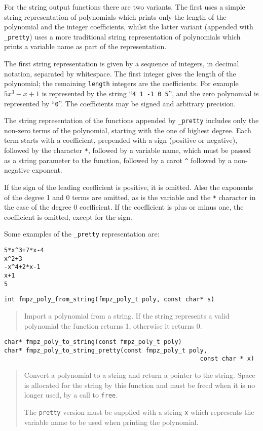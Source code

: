 \documentclass[a4paper,10pt]{article}
\newcommand{\code}{\lstinline}
\begin{document}
For the string output functions there are two variants. The first uses a simple string representation of polynomials which prints only the length of the polynomial and the integer coefficients, whilst the latter variant (appended with \code{_pretty}) uses a more traditional string representation of polynomials which prints a variable name as part of the representation. 

The first string representation is given by a sequence of integers, in decimal notation, separated by whitespace. The first integer gives the length of the polynomial; the remaining \code{length} integers are the coefficients. For example $5x^3 - x + 1$ is represented by the string ``\code{4 1 -1 0 5}'', and the zero polynomial is represented by ``\code{0}''. The coefficients may be signed and arbitrary precision.

The string representation of the functions appended by \code{_pretty} includes only the non-zero terms of the polynomial, starting with the one of highest degree. Each term starts with a coefficient, prepended with a sign (positive or negative), followed by the character \code{*}, followed by a variable name, which must be passed as a string parameter to the function, followed by a carot \code{^} followed by a non-negative exponent.

If the sign of the leading coefficient is positive, it is omitted. Also the exponents of the degree 1 and 0 terms are omitted, as is the variable and the \code{*} character in the case of the degree 0 coefficient. If the coefficient is plus or minus one, the coefficient is omitted, except for the sign.

Some examples of the \code{_pretty} representation are:

\begin{lstlisting}
5*x^3+7*x-4
x^2+3
-x^4+2*x-1
x+1
5
\end{lstlisting}

\begin{lstlisting}
int fmpz_poly_from_string(fmpz_poly_t poly, const char* s)
\end{lstlisting}
\begin{quote}
Import a polynomial from a string. If the string represents a valid polynomial the function returns 1, otherwise it returns 0.
\end{quote}

\begin{lstlisting}
char* fmpz_poly_to_string(const fmpz_poly_t poly)
char* fmpz_poly_to_string_pretty(const fmpz_poly_t poly, 
                                                      const char * x)
\end{lstlisting}
\begin{quote}
Convert a polynomial to a string and return a pointer to the string. Space is allocated for the string by this function and must be freed when it is no longer used, by a call to \code{free}.

The \code{pretty} version must be supplied with a string \code{x} which represents the variable name to be used when printing the polynomial.
\end{quote}
\end{document}
